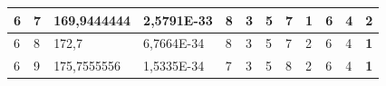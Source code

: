 \documentclass[conference]{IEEEtran}
\begin{document}
\begin{table}[]
\begin{tabular}{|llll|llllllll|}
\multicolumn{1}{|l|}{6}                                                              & \multicolumn{1}{l|}{7}                                                                 & \multicolumn{1}{l|}{169,9444444}                                                           & 2,5791E-33                              & \multicolumn{1}{l|}{8}                                                           & \multicolumn{1}{l|}{3}                                                           & \multicolumn{1}{l|}{5}                                                           & \multicolumn{1}{l|}{7}                                                           & \multicolumn{1}{l|}{\textbf{1}}                                                  & \multicolumn{1}{l|}{6}                                                           & \multicolumn{1}{l|}{4}                                                           & 2                                   \\ \hline
\multicolumn{1}{|l|}{6}                                                              & \multicolumn{1}{l|}{8}                                                                 & \multicolumn{1}{l|}{172,7}                                                                 & 6,7664E-34                              & \multicolumn{1}{l|}{8}                                                           & \multicolumn{1}{l|}{3}                                                           & \multicolumn{1}{l|}{5}                                                           & \multicolumn{1}{l|}{7}                                                           & \multicolumn{1}{l|}{2}                                                           & \multicolumn{1}{l|}{6}                                                           & \multicolumn{1}{l|}{4}                                                           & \textbf{1}                          \\ \hline
\multicolumn{1}{|l|}{6}                                                              & \multicolumn{1}{l|}{9}                                                                 & \multicolumn{1}{l|}{175,7555556}                                                           & 1,5335E-34                              & \multicolumn{1}{l|}{7}                                                           & \multicolumn{1}{l|}{3}                                                           & \multicolumn{1}{l|}{5}                                                           & \multicolumn{1}{l|}{8}                                                           & \multicolumn{1}{l|}{2}                                                           & \multicolumn{1}{l|}{6}                                                           & \multicolumn{1}{l|}{4}                                                           & \textbf{1}                          \\ \hline

\end{tabular}
\end{table}
\end{document}
